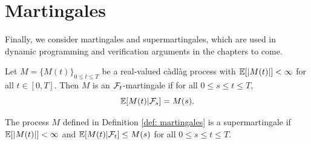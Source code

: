 \section{Martingales}
\label{section: Margtingales}
Finally, we consider martingales and supermartingales, which are used in dynamic programming and verification arguments in the chapters to come. 
\begin{definition}[Martingales]
\label{def: martingales}
    Let $M=\{M(t)\}_{0 \leq t \leq T}$ be a real-valued càdlàg process with $\mathbb{E}[|M(t)|] < \infty$ for all $t \in [0,T]$. Then $M$ is an $\mathcal{F}_t$-martingale if for all $0 \leq s  \leq t \leq T$, 
    \begin{equation*}
        \mathbb{E}[M(t) | \mathcal{F}_s] = M(s).
    \end{equation*}
\end{definition}
\begin{definition}
    The process $M$ defined in Definition \ref{def: martingales} is a supermartingale if $\mathbb{E}[|M(t)|] < \infty$ and $\mathbb{E}[M(t) | \mathcal{F}_t] \leq M(s)$ for all $0 \leq s \leq t \leq T$. 
\end{definition}
